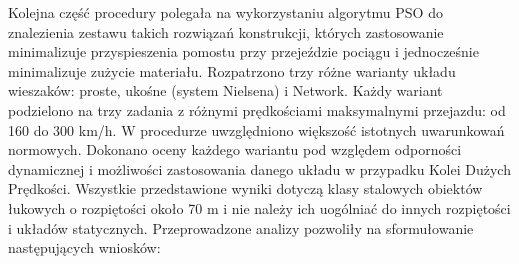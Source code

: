 Kolejna część procedury polegała na wykorzystaniu algorytmu PSO do znalezienia zestawu takich rozwiązań konstrukcji, których zastosowanie minimalizuje przyspieszenia pomostu przy przejeździe pociągu i jednocześnie minimalizuje zużycie materiału. Rozpatrzono trzy różne warianty układu wieszaków: proste, ukośne (system Nielsena) i Network. Każdy wariant podzielono na trzy zadania z różnymi prędkościami maksymalnymi przejazdu: od 160 do 300 km/h. W procedurze uwzględniono większość istotnych uwarunkowań normowych.
Dokonano oceny każdego wariantu pod względem odporności dynamicznej i możliwości zastosowania danego układu w przypadku Kolei Dużych Prędkości. Wszystkie przedstawione wyniki dotyczą klasy stalowych obiektów łukowych o rozpiętości około 70 m i nie należy ich uogólniać do innych rozpiętości i układów statycznych. Przeprowadzone analizy pozwoliły na sformułowanie następujących wniosków:
